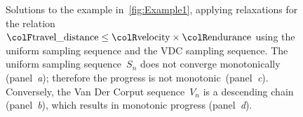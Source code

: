\begin{figure}[h]
    \centering

    \centering

    \caption{
        Solutions to the example in~\cref{fig:Example1}, applying relaxations for the relation ${\colF\text{travel\_distance}}\leq{\colR\text{velocity}}\times{\colR\text{endurance}}$ using the uniform sampling sequence and the VDC sampling sequence.
        The uniform sampling sequence~$S_{n}$ does not converge monotonically (panel~\emph{a}); therefore the progress is not monotonic~(panel\emph{~c}).
        Conversely, the Van Der Corput sequence~$V_{n}$ is a descending chain (panel~\emph{b}), which results in monotonic progress (panel~\emph{d}).
    }
\end{figure}

%
%
%
%

